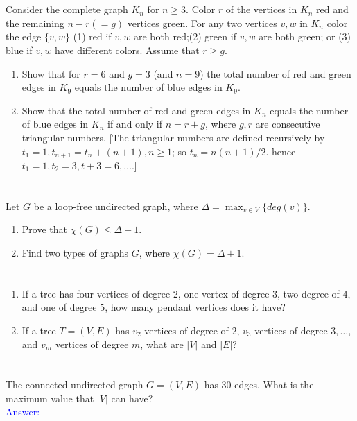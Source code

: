 \documentclass[a4paper]{article}
\begin{document}
\section{}
Consider the complete graph $K_n$ for $n\geq 3$. Color $r$ of the vertices in $K_n$ red and the remaining $n-r(=g)$ vertices green. For any two vertices $v,w$ in $K_n$ color the edge $\{v,w\}$ (1) red if $v,w$ are both red;(2) green if $v,w$ are both green; or (3) blue if $v,w$ have different colors. Assume that $r\geq g$.
    \begin{enumerate}[label=\alph*)]
        \item Show that for $r=6$ and $g=3$ (and $n=9$) the total number of red and green edges in $K_9$ equals the number of blue edges in $K_9$.
        \item Show that the total number of red and green edges in $K_n$ equals the number of blue edges in $K_n$ if and only if $n=r+g$, where $g,r$ are consecutive triangular numbers. [The triangular numbers are defined recursively by $t_1=1, t_{n+1}=t_n+(n+1), n\geq 1$; so $t_n=n(n+1)/2$. hence $t_1=1,t_2=3,t+3=6,\ldots$.] 
    \end{enumerate}

\section{}
Let $G$ be a loop-free undirected graph, where $\Delta=\max_{v\in V}\{deg(v)\}$.
    \begin{enumerate}
        \item Prove that $\chi(G)\leq\Delta+1$.
        \item Find two types of graphs $G$, where $\chi(G)=\Delta+1$.
    \end{enumerate}

\section{}
\begin{enumerate}[label=\alph*)]
    \item If a tree has four vertices of degree $2$, one vertex of degree $3$, two degree of $4$, and one of degree $5$, how many pendant vertices does it have?
    \item If a tree $T=(V,E)$ has $v_2$ vertices of degree of $2$, $v_3$ vertices of degree $3,\ldots,$ and $v_m$ vertices of degree $m$, what are $|V|$ and $|E|$?
\end{enumerate}
\section{}
The connected undirected graph $G=(V,E)$ has $30$ edges. What is the maximum value that $|V|$ can have?\\
 \textcolor{blue}{Answer:} 
 
\end{document}
